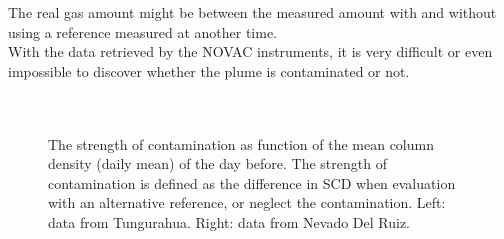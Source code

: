 The real gas amount might be between the measured amount with and without using a reference measured at another time.\\
%
With the data retrieved by the NOVAC instruments, it is very difficult or even impossible to discover whether the plume is contaminated or not. \\
\\
\\
\begin{figure}
	\caption[The strength of contamination as function of the mean  column density (daily mean) of the day before. Data from Tungurahua and Nevado Del Ruiz.]{The strength of contamination as function of the mean  column density (daily mean) of the day before. The strength of contamination is defined as the difference in  SCD  when evaluation with an alternative reference, or neglect the contamination. Left: data from Tungurahua. Right: data from Nevado Del Ruiz. }
	\label{fig:contaminationdependencyso2}
\end{figure}

